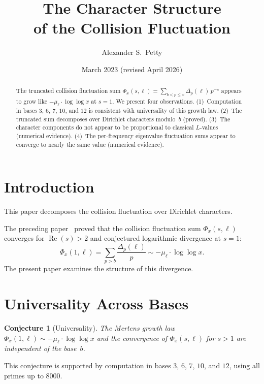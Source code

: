 \documentclass[12pt]{amsart}
\title{The Character Structure\\of the Collision Fluctuation}
\author{Alexander S.\ Petty}
\date{March 2023 (revised April 2026)}
\newtheorem{conjecture}[theorem]{Conjecture}
\theoremstyle{definition}
\theoremstyle{remark}
\begin{document}
\begin{abstract}
The truncated collision fluctuation sum
$\Phi_x(s, \ell) = \sum_{b < p \le x}
\Delta_p(\ell)\, p^{-s}$ appears to grow like
$-\mu_{\ell} \cdot \log\log x$ at $s = 1$.
We present four observations.
(1)~Computation in bases $3$, $6$, $7$, $10$, and $12$
is consistent with universality of this growth law.
(2)~The truncated sum decomposes over Dirichlet characters
modulo~$b$ (proved).
(3)~The character components do not appear to be
proportional to classical $L$-values (numerical evidence).
(4)~The per-frequency eigenvalue fluctuation sums appear
to converge to nearly the same value (numerical evidence).
\end{abstract}
\maketitle

\section{Introduction}

This paper decomposes the collision fluctuation over Dirichlet characters.

The preceding paper~\cite{paper13} proved that the
collision fluctuation sum $\Phi_x(s, \ell)$ converges for
$\operatorname{Re}(s) > 2$ and conjectured logarithmic
divergence at $s = 1$:
\[
\Phi_x(1, \ell) = \sum_{p > b} \frac{\Delta_p(\ell)}{p}
\sim -\mu_{\ell} \cdot \log\log x.
\]
The present paper examines the structure of this divergence.

\section{Universality Across Bases}

\begin{conjecture}[Universality]\label{conj:universal}
The Mertens growth law $\Phi_x(1, \ell) \sim -\mu_{\ell} \cdot
\log\log x$ and the convergence of $\Phi_x(s, \ell)$ for $s > 1$
are independent of the base~$b$.
\end{conjecture}

This conjecture is supported by computation in bases $3$, $6$,
$7$, $10$, and $12$, using all primes up to $8000$.
\end{document}
